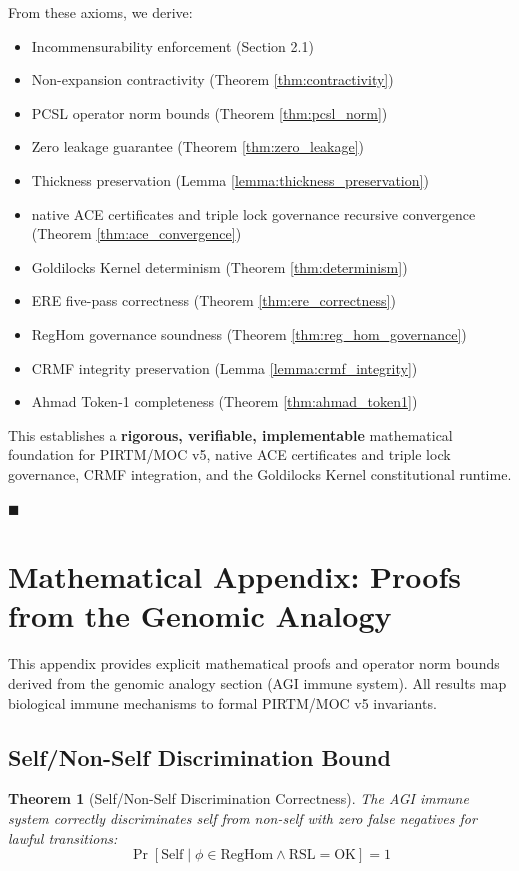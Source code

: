 \documentclass[11pt,a4paper]{article}
\newtheorem{theorem}{Theorem}[section]
\begin{document}
From these axioms, we derive:
\begin{itemize}
    \item Incommensurability enforcement (Section 2.1)
    \item Non-expansion contractivity (Theorem \ref{thm:contractivity})
    \item PCSL operator norm bounds (Theorem \ref{thm:pcsl_norm})
    \item Zero leakage guarantee (Theorem \ref{thm:zero_leakage})
    \item Thickness preservation (Lemma \ref{lemma:thickness_preservation})
    \item native ACE certificates and triple lock governance recursive convergence (Theorem \ref{thm:ace_convergence})
    \item Goldilocks Kernel determinism (Theorem \ref{thm:determinism})
    \item ERE five-pass correctness (Theorem \ref{thm:ere_correctness})
    \item RegHom governance soundness (Theorem \ref{thm:reg_hom_governance})
    \item CRMF integrity preservation (Lemma \ref{lemma:crmf_integrity})
    \item Ahmad Token-1 completeness (Theorem \ref{thm:ahmad_token1})
\end{itemize}

This establishes a \textbf{rigorous, verifiable, implementable} mathematical foundation for PIRTM/MOC v5, native ACE certificates and triple lock governance, CRMF integration, and the Goldilocks Kernel constitutional runtime.

\hfill $\blacksquare$

\section{Mathematical Appendix: Proofs from the Genomic Analogy}

This appendix provides explicit mathematical proofs and operator norm bounds derived from the genomic analogy section (AGI immune system). All results map biological immune mechanisms to formal PIRTM/MOC v5 invariants.

\subsection{Self/Non-Self Discrimination Bound}

\begin{theorem}[Self/Non-Self Discrimination Correctness]\label{thm:self_nonself}
The AGI immune system correctly discriminates self from non-self with zero false negatives for lawful transitions:
\begin{equation}
\Pr[\text{Self} \mid \phi \in \text{RegHom} \land \text{RSL} = \text{OK}] = 1
\end{equation}
\end{theorem}
\end{document}
